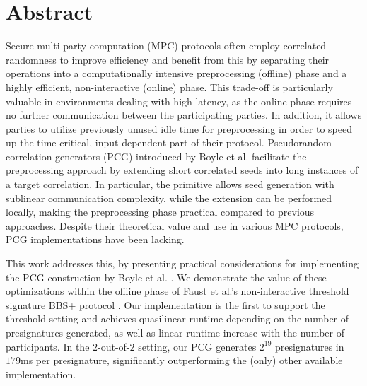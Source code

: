\section*{Abstract}
Secure multi-party computation (MPC) protocols often employ correlated randomness to improve efficiency and benefit from this by separating their operations into a computationally intensive preprocessing (offline) phase and a highly efficient, non-interactive (online) phase. This trade-off is particularly valuable in environments dealing with high latency, as the online phase requires no further communication between the participating parties. In addition, it allows parties to utilize previously unused idle time for preprocessing in order to speed up the time-critical, input-dependent part of their protocol. Pseudorandom correlation generators (PCG) introduced by Boyle et al. \cite{boyle2019efficient, boyle2020efficient} facilitate the preprocessing approach by extending short correlated seeds into long instances of a target correlation. In particular, the primitive allows seed generation with sublinear communication complexity, while the extension can be performed locally, making the preprocessing phase practical compared to previous approaches. Despite their theoretical value and use in various MPC protocols, PCG implementations have been lacking. 

This work addresses this, by presenting practical considerations for implementing the PCG construction by Boyle et al. \cite{boyle2020efficient}. We demonstrate the value of these optimizations within the offline phase of Faust et al.'s non-interactive threshold signature BBS+ protocol \cite{faust2023non}. Our implementation is the first to support the threshold setting and achieves quasilinear runtime depending on the number of presignatures generated, as well as linear runtime increase with the number of participants. In the $2$-out-of-$2$ setting, our PCG generates $2^{19}$ presignatures in $179$ms per presignature, significantly outperforming the (only) other available implementation. 